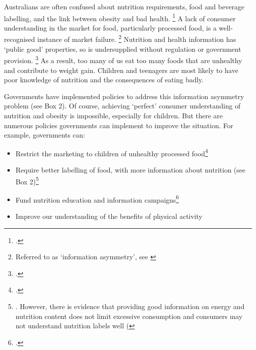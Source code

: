 \documentclass[embargoed]{grattan}
\begin{document}
Australians are often confused about nutrition requirements, food and beverage labelling, and the link between obesity and bad health.%
\footcites{Baker2014Fatnationwhy}{Karnani2016ObesityCrisisas} A lack of consumer understanding in the market for food, particularly processed food, is a well-recognised instance of market failure.%
\footnote{Referred to as `information asymmetry', see \textcites{Karnani2016ObesityCrisisas}{Freebairn2010Taxationobesity}} Nutrition and health information has `public good' properties, so is undersupplied without regulation or government provision.%
\footcite{Freebairn2010Taxationobesity} As a result, too many of us eat too many foods that are unhealthy and contribute to weight gain.
Children and teenagers are most likely to have poor knowledge of nutrition and the consequences of eating badly.

Governments have implemented policies to address this information asymmetry problem (see Box 2).
Of course, achieving `perfect' consumer understanding of nutrition and obesity is impossible, especially for children.
But there are numerous policies governments can implement to improve the situation.
For example, governments can:

\begin{itemize}
\item
  Restrict the marketing to children of unhealthy processed food\footcites{Organization2016Reportcommissionending}{Cairns2013Systematicreviewsevidence}{Magnus2009costeffectivenessremoving}{Chou2005Fastfoodrestaurant}{Boyland2011Foodcommercialsincrease}{Capacci2012Policiespromotehealthy}
\item
  Require better labelling of food, with more information about nutrition (see Box 2)\footnote{\textcites{MacKay2011Legislativesolutionsunhealthy}{Freebairn2010Taxationobesity}{Capacci2012Policiespromotehealthy}{Roberto2012Factsfrontversus}{Restrepo2014Calorielabelingchain}{Magnusson2010Obesitypreventionpersonal}{Cowburn2005Consumerunderstandinguse}{Hawley2013sciencefrontpackage}{Mejean2014Associationperceptionfront}.
However, there is evidence that providing good information on energy and nutrition content does not limit excessive consumption and consumers may not understand nutrition labels well (\textcites{Downs2009Strategiespromotinghealthier}{Cowburn2005Consumerunderstandinguse}{Watson2013Howwelldo}}
\item
  Fund nutrition education and information campaigns\footcites{Organization2016Reportcommissionending}{Capacci2012Policiespromotehealthy}{Hawkes2013Promotinghealthydiets}{Pettigrew2013Consumersinabilityestimate}{Liquori1998CookshopProgramoutcome}
\item
  Improve our understanding of the benefits of physical activity
 \end{itemize}
\end{document}
